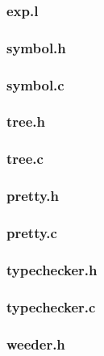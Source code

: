 \documentclass[a4paper,10pt,titlepage]{report}
\begin{document}
\subsubsection{exp.l}


\subsubsection{symbol.h}


\subsubsection{symbol.c}


\subsubsection{tree.h}


\subsubsection{tree.c}


\subsubsection{pretty.h}


\subsubsection{pretty.c}


\subsubsection{typechecker.h}


\subsubsection{typechecker.c}


\subsubsection{weeder.h}

\end{document}
